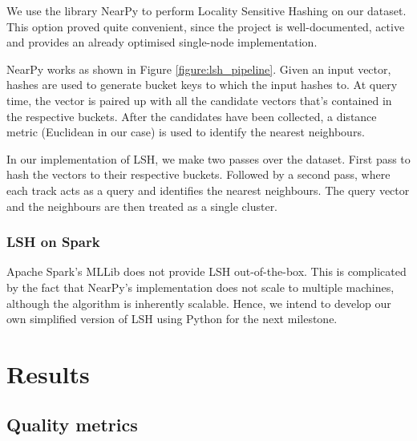\documentclass[10pt,a4paper]{scrartcl}
\begin{document}
      We use the library NearPy to perform Locality Sensitive Hashing on our
      dataset.
      This option proved quite convenient, since the project is well-documented,
      active and provides an already optimised single-node implementation.
    
      NearPy works as shown in Figure \ref{figure:lsh_pipeline}. 
      Given an input vector, hashes are used to generate bucket keys to which
      the input hashes to.
      At query time, the vector is paired up with all the candidate vectors
      that's contained in the respective buckets.
      After the candidates have been collected, a distance metric
      (Euclidean in our case) is used to identify the nearest neighbours.
    
      In our implementation of LSH, we make two passes over the dataset.
      First pass to hash the vectors to their respective buckets.
      Followed by a second pass, where each track acts as a query and
      identifies the nearest neighbours.
      The query vector and the neighbours are then treated as a single cluster.
  
      \subsubsection{LSH on Spark} \label{sec:implementation:subsec:spark}
        Apache Spark's MLLib does not provide LSH out-of-the-box.
        This is complicated by the fact that NearPy's implementation does
        not scale to multiple machines, although the algorithm is
        inherently scalable.
        Hence, we intend to develop our own simplified version of LSH using
        Python for the next milestone.

  \section{Results}
    \subsection{Quality metrics}
\end{document}
